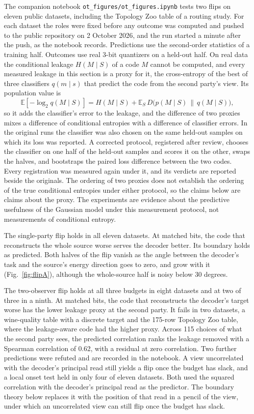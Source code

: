 \documentclass[11pt]{article}
\newcommand{\E}{\mathbb{E}}
\begin{document}
The companion notebook \texttt{ot\_figures/ot\_figures.ipynb} tests two
flips on eleven public datasets, including the Topology Zoo table of a
routing study. For each dataset the roles were fixed before any outcome
was computed and pushed to the public repository on 2 October 2026, and
the run started a minute after the push, as the notebook records. Predictions use the
second-order statistics of a training half. Outcomes use real 3-bit
quantizers on a held-out half. On real data the conditional leakage
$H(M\mid S)$ of a code $M$ cannot be computed, and every measured leakage
in this section is a proxy for it, the cross-entropy of the best of three
classifiers $q(m\mid s)$ that predict the code from the second party's
view. Its population value is
\[
\E[-\log_2 q(M\mid S)]=H(M\mid S)+\E_S\,D\bigl(p(M\mid S)\,\big\|\,q(M\mid S)\bigr),
\]
so it adds the classifier's error to the leakage, and the difference of
two proxies mixes a difference of conditional entropies with a
difference of classifier errors. In the original runs the classifier was
also chosen on the same held-out samples on which its loss was reported.
A corrected protocol, registered after review, chooses the classifier on
one half of the held-out samples and scores it on the other, swaps the
halves, and bootstraps the paired loss difference between the two codes.
Every registration was measured again under it, and its verdicts are
reported beside the originals. The ordering of two proxies does not
establish the ordering of the true conditional entropies under either
protocol, so the claims below are claims about the proxy. The
experiments are evidence about the predictive usefulness of the Gaussian
model under this measurement protocol, not measurements of conditional
entropy.

The single-party flip holds in all eleven datasets. At matched bits, the
code that reconstructs the whole source worse serves the decoder better.
Its boundary holds as predicted. Both halves of the flip vanish as the
angle between the decoder's task and the source's energy direction goes
to zero, and grow with it (Fig.~\ref{fig:flipA}), although the
whole-source half is noisy below 30 degrees.

The two-observer flip holds at all three budgets in eight datasets and
at two of three in a ninth. At matched bits, the code that reconstructs
the decoder's target worse has the lower leakage proxy at the second
party. It fails in two datasets, a wine-quality table with a discrete
target and the 175-row Topology Zoo table, where the leakage-aware code
had the higher proxy.
Across 115 choices of what the second party sees, the predicted
correlation ranks the leakage removed with a Spearman correlation of
0.62, with a residual at zero correlation. Two further predictions were
refuted and are recorded in the notebook. A view uncorrelated with the
decoder's principal read still yields a flip once the budget has slack,
and a local onset test held in only four of eleven datasets. Both used
the squared correlation with the decoder's principal read as the
predictor. The boundary theory below replaces it with the position of
that read in a pencil of the view, under which an uncorrelated view can
still flip once the budget has slack.
\end{document}
